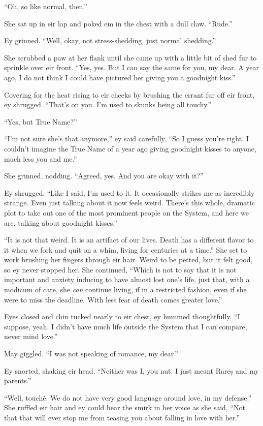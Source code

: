 ``Oh, so like normal, then.''

She sat up in eir lap and poked em in the chest with a dull claw. ``Rude.''

Ey grinned. ``Well, okay, not stress-shedding, just normal shedding.''

She scrubbed a paw at her flank until she came up with a little bit of shed fur to sprinkle over eir front. ``Yes, yes. But I can say the same for you, my dear. A year ago, I do not think I could have pictured her giving you a goodnight kiss.''

Covering for the heat rising to eir cheeks by brushing the errant fur off eir front, ey shrugged. ``That's on you. I'm used to skunks being all touchy.''

``Yes, but True Name?''

``I'm not sure she's that anymore,'' ey said carefully. ``So I guess you're right. I couldn't imagine the True Name of a year ago giving goodnight kisses to anyone, much less you and me.''

She grinned, nodding. ``Agreed, yes. And you are okay with it?''

Ey shrugged. ``Like I said, I'm used to it. It occasionally strikes me as incredibly strange. Even just talking about it now feels weird. There's this whole, dramatic plot to take out one of the most prominent people on the System, and here we are, talking about goodnight kisses.''

``It is not that weird. It is an artifact of our lives. Death has a different flavor to it when we fork and quit on a whim, living for centuries at a time.'' She set to work brushing her fingers through eir hair. Weird to be petted, but it felt good, so ey never stopped her. She continued, ``Which is not to say that it is not important and anxiety inducing to have almost lost one's life, just that, with a modicum of care, she \emph{can} continue living, if in a restricted fashion, even if she were to miss the deadline. With less fear of death comes greater love.''

Eyes closed and chin tucked nearly to eir chest, ey hummed thoughtfully. ``I suppose, yeah. I didn't have much life outside the System that I can compare, never mind love.''

May giggled. ``I was not speaking of romance, my dear.''

Ey snorted, shaking eir head. ``Neither was I, you nut. I just meant Rareș and my parents.''

``Well, touché. We do not have very good language around love, in my defense.'' She ruffled eir hair and ey could hear the smirk in her voice as she said, ``Not that that will ever stop me from teasing you about falling in love with her.''

